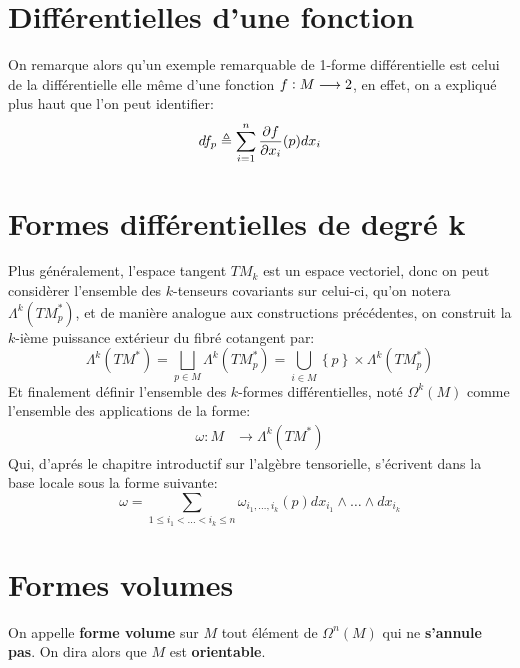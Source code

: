 \section{Différentielles d'une fonction}
On remarque alors qu'un exemple remarquable de 1-forme différentielle est celui de la différentielle elle même d'une fonction \( f : M \longrightarrow 2 \), en effet, on a expliqué plus haut que l'on peut identifier:
\[ 
   df_p \triangleq  \sum_{i=1}^n \frac{\partial f}{\partial x_i}(p)dx_i
\]
\section{Formes différentielles de degré k}
Plus généralement, l'espace tangent \( TM_k \) est un espace vectoriel, donc on peut considèrer l'ensemble des \( k \)-tenseurs covariants sur celui-ci, qu'on notera \( \Lambda^k(TM_p^*) \), et de manière analogue aux constructions précédentes, on construit la \( k \)-ième puissance extérieur du fibré cotangent par:
\[ 
   \Lambda^k(TM^*) = \bigsqcup_{p \in M} \Lambda^k(TM_p^*) = \bigcup_{i \in M} \left\{ p \right\} \times \Lambda^k(TM_p^*) 
\]
Et finalement définir l'ensemble des \( k \)-formes différentielles, noté \( \Omega^k(M) \) comme l'ensemble des applications de la forme:
\[ 
   \begin{aligned}
      \omega : M &\longrightarrow \Lambda^k(TM^*)
   \end{aligned} 
\]
Qui, d'aprés le chapitre introductif sur l'algèbre tensorielle, s'écrivent dans la base locale sous la forme suivante:
\[ 
   \omega = \sum_{1 \leq i_1 < \ldots < i_k \leq n} \omega_{i_1, \ldots, i_k}(p) dx_{i_1} \wedge \ldots \wedge dx_{i_k}
\]
\section{Formes volumes}
On appelle \textbf{forme volume} sur \( M \) tout élément de \( \Omega^n(M) \) qui ne \textbf{s'annule pas}. On dira alors que \( M \) est \textbf{orientable}.

\pagebreak
